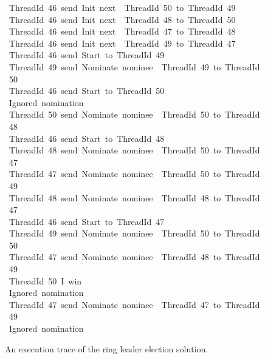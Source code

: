 \documentclass[sigplan,screen]{acmart}
\begin{document}
\begin{figure}
\raggedright
\scriptsize

\begin{tabbing}\ttfamily
~ThreadId~46~send~Init~next~~ThreadId~50~to~ThreadId~49\\
\ttfamily ~ThreadId~46~send~Init~next~~ThreadId~48~to~ThreadId~50\\
\ttfamily ~ThreadId~46~send~Init~next~~ThreadId~47~to~ThreadId~48\\
\ttfamily ~ThreadId~46~send~Init~next~~ThreadId~49~to~ThreadId~47\\
\ttfamily ~ThreadId~46~send~Start~to~ThreadId~49\\
\ttfamily ~ThreadId~49~send~Nominate~nominee~~ThreadId~49~to~ThreadId~50\\
\ttfamily ~ThreadId~46~send~Start~to~ThreadId~50\\
\ttfamily ~Ignored~nomination\\
\ttfamily ~ThreadId~50~send~Nominate~nominee~~ThreadId~50~to~ThreadId~48\\
\ttfamily ~ThreadId~46~send~Start~to~ThreadId~48\\
\ttfamily ~ThreadId~48~send~Nominate~nominee~~ThreadId~50~to~ThreadId~47\\
\ttfamily ~ThreadId~47~send~Nominate~nominee~~ThreadId~50~to~ThreadId~49\\
\ttfamily ~ThreadId~48~send~Nominate~nominee~~ThreadId~48~to~ThreadId~47\\
\ttfamily ~ThreadId~46~send~Start~to~ThreadId~47\\
\ttfamily ~ThreadId~49~send~Nominate~nominee~~ThreadId~50~to~ThreadId~50\\
\ttfamily ~ThreadId~47~send~Nominate~nominee~~ThreadId~48~to~ThreadId~49\\
\ttfamily ~ThreadId~50~I~win\\
\ttfamily ~Ignored~nomination\\
\ttfamily ~ThreadId~47~send~Nominate~nominee~~ThreadId~47~to~ThreadId~49\\
\ttfamily ~Ignored~nomination
\end{tabbing}

\normalsize
\caption{An execution trace of the ring leader election solution.}
\label{fig:main1-trace}
\end{figure}
\end{document}
